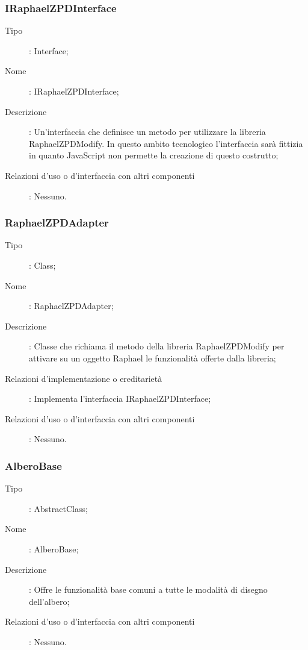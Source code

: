 \subsubsection{IRaphaelZPDInterface}
\begin{description}
\item[Tipo]: Interface;
\item[Nome]: IRaphaelZPDInterface;
\item[Descrizione]: Un'interfaccia che definisce un metodo per utilizzare la libreria RaphaelZPDModify. In questo ambito tecnologico l'interfaccia sarà fittizia in quanto JavaScript non permette la creazione di questo costrutto;
\item[Relazioni d'uso o d'interfaccia con altri componenti]: Nessuno.
\end{description}
\subsubsection{RaphaelZPDAdapter}
\begin{description}
\item[Tipo]: Class;
\item[Nome]: RaphaelZPDAdapter;
\item[Descrizione]: Classe che richiama il metodo della libreria RaphaelZPDModify per attivare su un oggetto Raphael le funzionalità offerte dalla libreria;
\item[Relazioni d'implementazione o ereditarietà]: Implementa l'interfaccia IRaphaelZPDInterface;
\item[Relazioni d'uso o d'interfaccia con altri componenti]: Nessuno.
\end{description}
\subsubsection{AlberoBase}
\begin{description}
\item[Tipo]: AbstractClass;
\item[Nome]: AlberoBase;
\item[Descrizione]: Offre le funzionalità base comuni a tutte le modalità di disegno dell'albero;
\item[Relazioni d'uso o d'interfaccia con altri componenti]: Nessuno.
\end{description}
